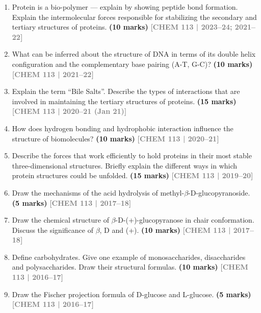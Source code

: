 \documentclass[12pt,a3paper]{article}
\newcommand{\yr}[1]{\hfill\textcolor{gray}{\small\textbf{[#1]}}}
\newcommand{\mk}[1]{\textcolor{orange!70!black}{\small\textbf{(#1 marks)}}}
\begin{document}
\begin{enumerate}
\item Protein is a bio-polymer --- explain by showing peptide bond formation. Explain the intermolecular forces responsible for stabilizing the secondary and tertiary structures of proteins. \mk{10}
\yr{CHEM 113 | 2023--24; 2021--22}



\item What can be inferred about the structure of DNA in terms of its double helix configuration and the complementary base pairing (A-T, G-C)? \mk{10}
\yr{CHEM 113 | 2021--22}




\item Explain the term ``Bile Salts''. Describe the types of interactions that are involved in maintaining the tertiary structures of proteins. \mk{15}
\yr{CHEM 113 | 2020--21 (Jan 21)}



\item How does hydrogen bonding and hydrophobic interaction influence the structure of biomolecules? \mk{10}
\yr{CHEM 113 | 2020--21}



\item Describe the forces that work efficiently to hold proteins in their most stable three-dimensional structures. Briefly explain the different ways in which protein structures could be unfolded. \mk{15}
\yr{CHEM 113 | 2019--20}



\item Draw the mechanisms of the acid hydrolysis of methyl-$\beta$-D-glucopyranoside. \mk{5}
\yr{CHEM 113 | 2017--18}



\item Draw the chemical structure of $\beta$-D-(+)-glucopyranose in chair conformation. Discuss the significance of $\beta$, D and (+). \mk{10}
\yr{CHEM 113 | 2017--18}



\item Define carbohydrates. Give one example of monosaccharides, disaccharides and polysaccharides. Draw their structural formulas. \mk{10}
\yr{CHEM 113 | 2016--17}



\item Draw the Fischer projection formula of D-glucose and L-glucose. \mk{5}
\yr{CHEM 113 | 2016--17}




\end{enumerate}
\end{document}

